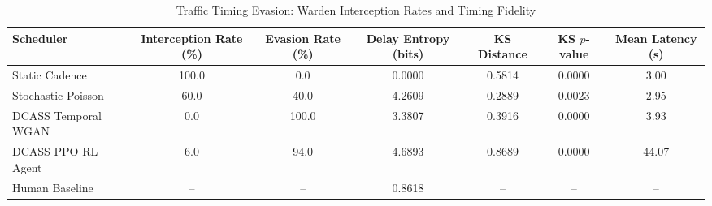 \begin{table}[htbp]
\centering
\caption{Traffic Timing Evasion: Warden Interception Rates and Timing Fidelity}
\label{tab:traffic_evasion}
\begin{tabular}{lcccccc}
\toprule
Scheduler & Interception Rate (\%) & Evasion Rate (\%) & Delay Entropy (bits) & KS Distance & KS $p$-value & Mean Latency (s) \\
\midrule
Static Cadence & 100.0 & 0.0 & 0.0000 & 0.5814 & 0.0000 & 3.00 \\
Stochastic Poisson & 60.0 & 40.0 & 4.2609 & 0.2889 & 0.0023 & 2.95 \\
DCASS Temporal WGAN & 0.0 & 100.0 & 3.3807 & 0.3916 & 0.0000 & 3.93 \\
DCASS PPO RL Agent & 6.0 & 94.0 & 4.6893 & 0.8689 & 0.0000 & 44.07 \\
\midrule
Human Baseline & -- & -- & 0.8618 & -- & -- & -- \\
\bottomrule
\end{tabular}
\end{table}
